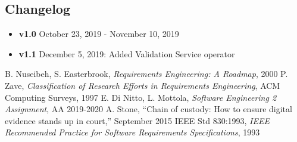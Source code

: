 \begin{appendices}
	\section{Changelog}
	\begin{itemize}
		\item \textbf{v1.0} October 23, 2019 - November 10, 2019
		\item \textbf{v1.1} December 5, 2019: Added Validation Service operator
	
	\end{itemize}
\end{appendices}

\clearpage

\begin{thebibliography}{9}

B. Nuseibeh, S. Easterbrook, \emph{Requirements Engineering: A Roadmap}, 2000
P. Zave, \emph{Classification of Research Efforts in Requirements
Engineering}, ACM Computing Surveys, 1997
 E. Di Nitto, L. Mottola, \emph{Software Engineering 2 Assignment}, AA 2019-2020
 A. Stone, “Chain of custody: How to ensure digital evidence stands up in court,” September 2015
IEEE Std 830:1993, \emph{IEEE Recommended Practice for Software Requirements Specifications}, 1993

\end{thebibliography}
